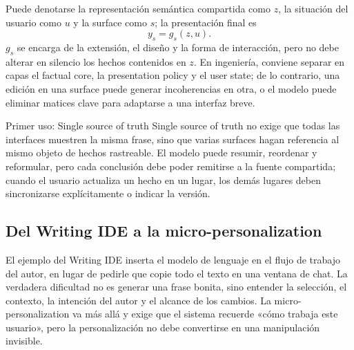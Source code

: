 


Puede denotarse la representación semántica compartida como $z$, la situación del usuario como $u$ y la surface como $s$; la presentación final es
\[
y_s=g_s(z,u).
\]
$g_s$ se encarga de la extensión, el diseño y la forma de interacción, pero no debe alterar en silencio los hechos contenidos en $z$. En ingeniería, conviene separar en capas el factual core, la presentation policy y el user state; de lo contrario, una edición en una surface puede generar incoherencias en otra, o el modelo puede eliminar matices clave para adaptarse a una interfaz breve.

\begin{knowledgebox}{Primer uso: Single source of truth}
Single source of truth no exige que todas las interfaces muestren la misma frase, sino que varias surfaces hagan referencia al mismo objeto de hechos rastreable. El modelo puede resumir, reordenar y reformular, pero cada conclusión debe poder remitirse a la fuente compartida; cuando el usuario actualiza un hecho en un lugar, los demás lugares deben sincronizarse explícitamente o indicar la versión.
\end{knowledgebox}

\subsection{Del Writing IDE a la micro-personalization}

El ejemplo del Writing IDE inserta el modelo de lenguaje en el flujo de trabajo del autor, en lugar de pedirle que copie todo el texto en una ventana de chat. La verdadera dificultad no es generar una frase bonita, sino entender la selección, el contexto, la intención del autor y el alcance de los cambios. La micro-personalization va más allá y exige que el sistema recuerde «cómo trabaja este usuario», pero la personalización no debe convertirse en una manipulación invisible.

